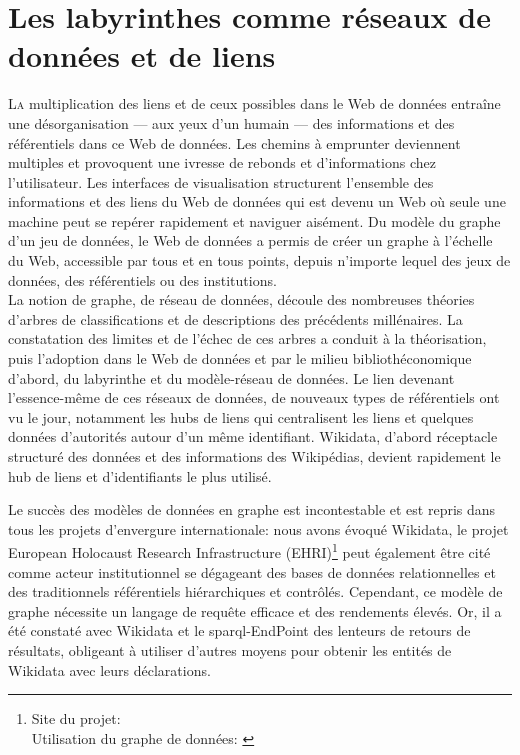 \chapter{\label{III-A}Les labyrinthes comme réseaux de données et de liens}

\lettrine{L}a multiplication des liens et de ceux possibles dans le Web de données entraîne une désorganisation --- aux yeux d'un humain --- des informations et des référentiels dans ce Web de données. Les chemins à emprunter deviennent multiples et provoquent une ivresse de rebonds et d'informations chez l'utilisateur. Les interfaces de visualisation structurent l'ensemble des informations et des liens du Web de données qui est devenu un Web où seule une machine peut se repérer rapidement et naviguer aisément. Du modèle du graphe d'un jeu de données, le Web de données a permis de créer un graphe à l'échelle du Web, accessible par tous et en tous points, depuis n'importe lequel des jeux de données, des référentiels ou des institutions.\\

La notion de graphe, de réseau de données, découle des nombreuses théories d'arbres de classifications et de descriptions des précédents millénaires. La constatation des limites et de l'échec de ces arbres a conduit à la théorisation, puis l'adoption dans le Web de données et par le milieu bibliothéconomique d'abord, du labyrinthe et du modèle-réseau de données. Le lien devenant l'essence-même de ces réseaux de données, de nouveaux types de référentiels ont vu le jour, notamment les hubs de liens qui centralisent les liens et quelques données d'autorités autour d'un même identifiant. Wikidata, d'abord réceptacle structuré des données et des informations des Wikipédias, devient rapidement le hub de liens et d'identifiants le plus utilisé.





\bigskip
\bigskip
\bigskip
Le succès des modèles de données en graphe est incontestable et est repris dans tous les projets d'envergure internationale: nous avons évoqué Wikidata, le projet European Holocaust Research Infrastructure (EHRI)\footnote{Site du projet: \cite{noauthor_european_nodate}\\Utilisation du graphe de données: \cite{blanke_developing_2015}} peut également être cité comme acteur institutionnel se dégageant des bases de données relationnelles et des traditionnels référentiels hiérarchiques et contrôlés. Cependant, ce modèle de graphe nécessite un langage de requête efficace et des rendements élevés. Or, il a été constaté avec Wikidata et le \ac{sparql}-EndPoint des lenteurs de retours de résultats, obligeant à utiliser d'autres moyens pour obtenir les entités de Wikidata avec leurs déclarations.\\

